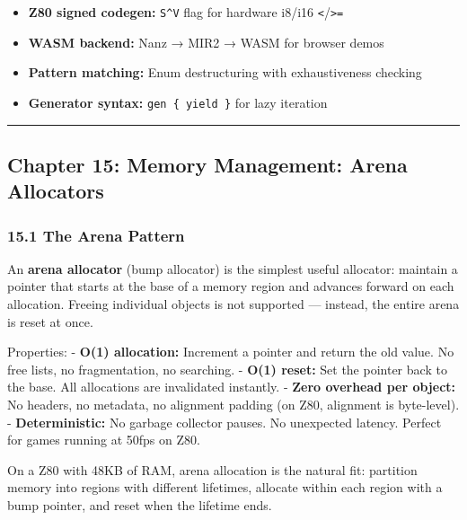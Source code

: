 \documentclass[
  11pt,
]{article}
\providecommand{\tightlist}{%
  \setlength{\itemsep}{0pt}\setlength{\parskip}{0pt}}
\begin{document}
\begin{itemize}
\tightlist
\item
  \textbf{Z80 signed codegen:} \texttt{S\^{}V} flag for hardware i8/i16
  \texttt{\textless{}}/\texttt{\textgreater{}=}
\item
  \textbf{WASM backend:} Nanz → MIR2 → WASM for browser demos
\item
  \textbf{Pattern matching:} Enum destructuring with exhaustiveness
  checking
\item
  \textbf{Generator syntax:} \texttt{gen\ \{\ yield\ \}} for lazy
  iteration
\end{itemize}

\begin{center}\rule{0.5\linewidth}{0.5pt}\end{center}

\hypertarget{chapter-15-memory-management-arena-allocators}{%
\subsection{Chapter 15: Memory Management: Arena
Allocators}\label{chapter-15-memory-management-arena-allocators}}

\hypertarget{the-arena-pattern}{%
\subsubsection{15.1 The Arena Pattern}\label{the-arena-pattern}}

An \textbf{arena allocator} (bump allocator) is the simplest useful
allocator: maintain a pointer that starts at the base of a memory region
and advances forward on each allocation. Freeing individual objects is
not supported --- instead, the entire arena is reset at once.

Properties: - \textbf{O(1) allocation:} Increment a pointer and return
the old value. No free lists, no fragmentation, no searching. -
\textbf{O(1) reset:} Set the pointer back to the base. All allocations
are invalidated instantly. - \textbf{Zero overhead per object:} No
headers, no metadata, no alignment padding (on Z80, alignment is
byte-level). - \textbf{Deterministic:} No garbage collector pauses. No
unexpected latency. Perfect for games running at 50fps on Z80.

On a Z80 with 48KB of RAM, arena allocation is the natural fit:
partition memory into regions with different lifetimes, allocate within
each region with a bump pointer, and reset when the lifetime ends.
\end{document}
